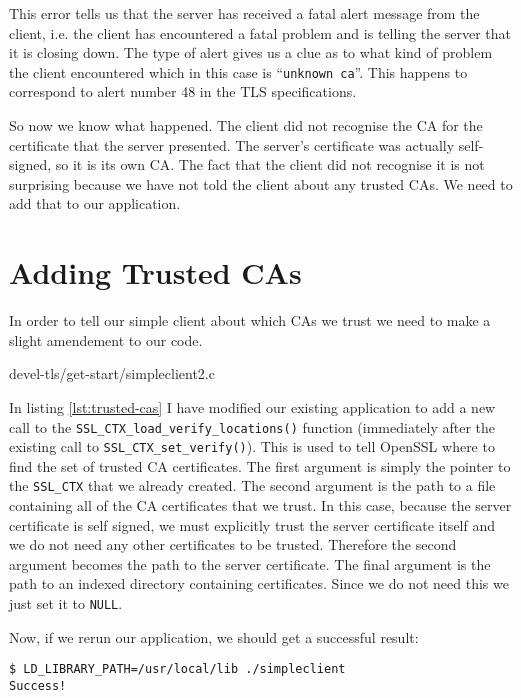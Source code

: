 This error tells us that the server has received a fatal alert message from the 
client, i.e. the client has encountered a fatal problem and is telling the 
server that it is closing down. The type of alert gives us a clue as to what 
kind of problem the client encountered which in this case is
``\verb!unknown ca!''. This happens to correspond to alert number 48 in the TLS 
specifications.

So now we know what happened. The client did not recognise the CA for the 
certificate that the server presented. The server's certificate was actually 
self-signed, so it is its own CA. The fact that the client did not recognise it 
is not surprising because we have not told the client about any trusted CAs. We 
need to add that to our application.

\section{Adding Trusted CAs}

In order to tell our simple client about which CAs we trust we need to make a 
slight amendement to our code.


{devel-tls/get-start/simpleclient2.c}

In listing \ref{lst:trusted-cas} I have modified our existing application to add
a new call to the \verb!SSL_CTX_load_verify_locations()! function (immediately
after the existing call to \verb!SSL_CTX_set_verify()!). This is used to tell 
OpenSSL where to find the set of trusted CA certificates. The first argument is
simply the pointer to the \verb!SSL_CTX! that we already created. The second
argument is the path to a file containing all of the CA certificates that we
trust. In this case, because the server certificate is self signed, we must
explicitly trust the server certificate itself and we do not need any other
certificates to be trusted. Therefore the second argument becomes the path to 
the server certificate. The final argument is the path to an indexed directory 
containing certificates. Since we do not need this we just set it to 
\verb!NULL!.

Now, if we rerun our application, we should get a successful result:

\begin{verbatim}
$ LD_LIBRARY_PATH=/usr/local/lib ./simpleclient
Success!
\end{verbatim}

